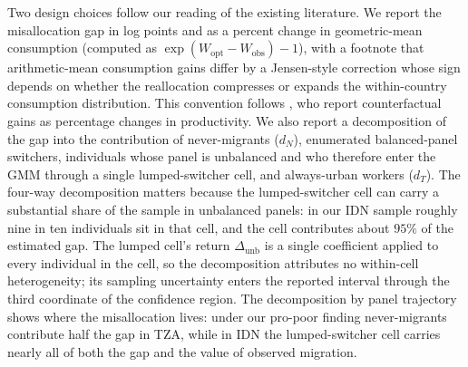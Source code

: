 \documentclass[12pt]{article}
\begin{document}
Two design choices follow our reading of the existing literature.
We report the misallocation gap in log points and as a percent change in geometric-mean consumption (computed as $\exp(W_{\text{opt}} - W_{\text{obs}}) - 1$), with a footnote that arithmetic-mean consumption gains differ by a Jensen-style correction whose sign depends on whether the reallocation compresses or expands the within-country consumption distribution.
This convention follows \cite{bryanAggregateProductivityEffects2019}, who report counterfactual gains as percentage changes in productivity.
We also report a decomposition of the gap into the contribution of never-migrants ($d_N$), enumerated balanced-panel switchers, individuals whose panel is unbalanced and who therefore enter the GMM through a single lumped-switcher cell, and always-urban workers ($d_T$).
The four-way decomposition matters because the lumped-switcher cell can carry a substantial share of the sample in unbalanced panels: in our IDN sample roughly nine in ten individuals sit in that cell, and the cell contributes about $95\%$ of the estimated gap.
The lumped cell's return $\Delta_{\text{unb}}$ is a single coefficient applied to every individual in the cell, so the decomposition attributes no within-cell heterogeneity; its sampling uncertainty enters the reported interval through the third coordinate of the confidence region.
The decomposition by panel trajectory shows where the misallocation lives: under our pro-poor finding never-migrants contribute half the gap in TZA, while in IDN the lumped-switcher cell carries nearly all of both the gap and the value of observed migration.
\end{document}
